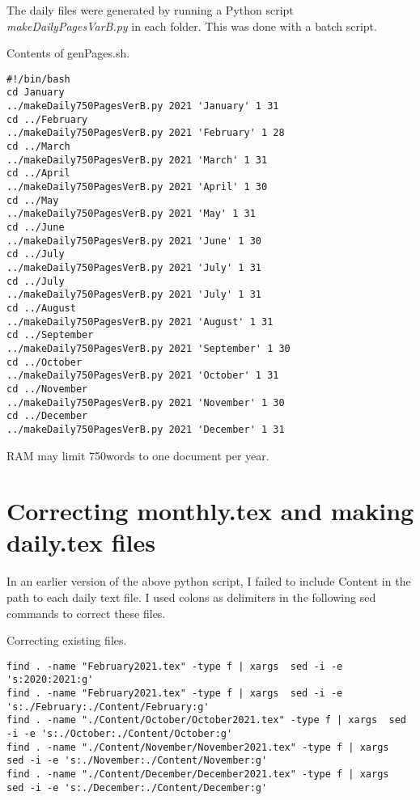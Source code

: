 The daily files were generated by running a Python script \emph{makeDailyPagesVarB.py} in each folder.
This was done with a batch script. 

\begin{code}{}
\label{lst750wordsMakingWords}
\caption{Contents of genPages.sh.}
\begin{verbatim}
#!/bin/bash
cd January
../makeDaily750PagesVerB.py 2021 'January' 1 31
cd ../February
../makeDaily750PagesVerB.py 2021 'February' 1 28
cd ../March
../makeDaily750PagesVerB.py 2021 'March' 1 31
cd ../April
../makeDaily750PagesVerB.py 2021 'April' 1 30
cd ../May
../makeDaily750PagesVerB.py 2021 'May' 1 31
cd ../June
../makeDaily750PagesVerB.py 2021 'June' 1 30
cd ../July
../makeDaily750PagesVerB.py 2021 'July' 1 31
cd ../July
../makeDaily750PagesVerB.py 2021 'July' 1 31
cd ../August
../makeDaily750PagesVerB.py 2021 'August' 1 31
cd ../September
../makeDaily750PagesVerB.py 2021 'September' 1 30
cd ../October
../makeDaily750PagesVerB.py 2021 'October' 1 31
cd ../November
../makeDaily750PagesVerB.py 2021 'November' 1 30
cd ../December
../makeDaily750PagesVerB.py 2021 'December' 1 31
\end{verbatim}
\end{code}


RAM may limit 750words to one document per year.


\section*{Correcting monthly.tex and making daily.tex files}

In an earlier version of the above python script, I failed to include Content in the path to each daily text file.
I used colons as delimiters in the following sed commands to correct these files. 

\begin{code}{}
\label{lst:750words}
\caption{Correcting existing files.}
\begin{verbatim}
find . -name "February2021.tex" -type f | xargs  sed -i -e 's:2020:2021:g'
find . -name "February2021.tex" -type f | xargs  sed -i -e 's:./February:./Content/February:g'
find . -name "./Content/October/October2021.tex" -type f | xargs  sed -i -e 's:./October:./Content/October:g'
find . -name "./Content/November/November2021.tex" -type f | xargs  sed -i -e 's:./November:./Content/November:g'
find . -name "./Content/December/December2021.tex" -type f | xargs  sed -i -e 's:./December:./Content/December:g'
\end{verbatim}
\end{code}